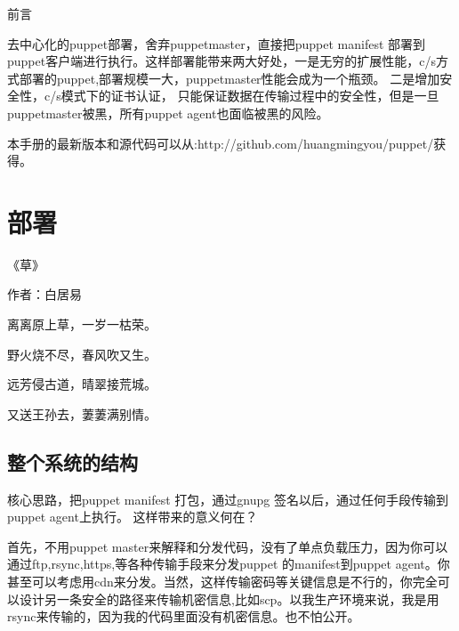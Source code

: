 \newpage
\begin{center}
\kai 前言
\end{center}
\fzsk
\par
去中心化的puppet部署，舍弃puppetmaster，直接把puppet manifest 部署到puppet客户端进行执行。这样部署能带来两大好处，一是无穷的扩展性能，c/s方式部署的puppet,部署规模一大，puppetmaster性能会成为一个瓶颈。 二是增加安全性，c/s模式下的证书认证，
只能保证数据在传输过程中的安全性，但是一旦puppetmaster被黑，所有puppet agent也面临被黑的风险。\par
本手册的最新版本和源代码可以从:http://github.com/huangmingyou/puppet/获得。
\song
\newpage
\chapter{\msyh 部署}
\begin{center}
\kai\small

《草》\par
作者：白居易 \par
离离原上草，一岁一枯荣。 \par
野火烧不尽，春风吹又生。 \par
远芳侵古道，晴翠接荒城。 \par
又送王孙去，萋萋满别情。 \par
\end{center}



\section{\msyh \small 整个系统的结构}
\fzsk 

核心思路，把puppet manifest 打包，通过gnupg 签名以后，通过任何手段传输到 puppet agent上执行。 这样带来的意义何在？ 
\par
首先，不用puppet master来解释和分发代码，没有了单点负载压力，因为你可以通过ftp,rsync,https,等各种传输手段来分发puppet 的manifest到puppet agent。你甚至可以考虑用cdn来分发。当然，这样传输密码等关键信息是不行的，你完全可以设计另一条安全的路径来传输机密信息,比如scp。以我生产环境来说，我是用rsync来传输的，因为我的代码里面没有机密信息。也不怕公开。

